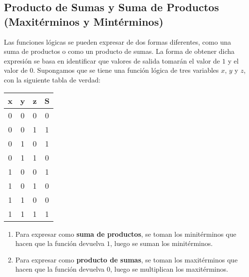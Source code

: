 \subsection{Producto de Sumas y Suma de Productos (Maxitérminos y Mintérminos)}
Las funciones lógicas se pueden expresar de dos formas diferentes, como una suma de productos o como un producto de sumas. La forma de obtener dicha expresión se basa en identificar que valores de salida tomarán el valor de $1$ y el valor de $0$.
\newline Supongamos que se tiene una función lógica de tres variables $x$, $y$ y $z$, con la siguiente tabla de verdad:

\begin{table}[h]
    \centering
    \begin{tabular}{ccc|c}
        \toprule
        \textbf{x} & \textbf{y} & \textbf{z} & \textbf{S}\\
        \midrule
        0 & 0 & 0 & 0\\
        0 & 0 & 1 & 1\\
        0 & 1 & 0 & 1\\
        0 & 1 & 1 & 0\\
        1 & 0 & 0 & 1\\
        1 & 0 & 1 & 0\\
        1 & 1 & 0 & 0\\
        1 & 1 & 1 & 1\\
        \bottomrule
    \end{tabular}
\end{table}

\begin{enumerate}
    \item Para expresar como \textbf{suma de productos}, se toman los minitérminos que hacen que la función devuelva $1$, luego se suman los minitérminos.
    \item Para expresar como \textbf{producto de sumas}, se toman los maxitérminos que hacen que la función devuelva $0$, luego se multiplican los maxitérminos.
\end{enumerate}


